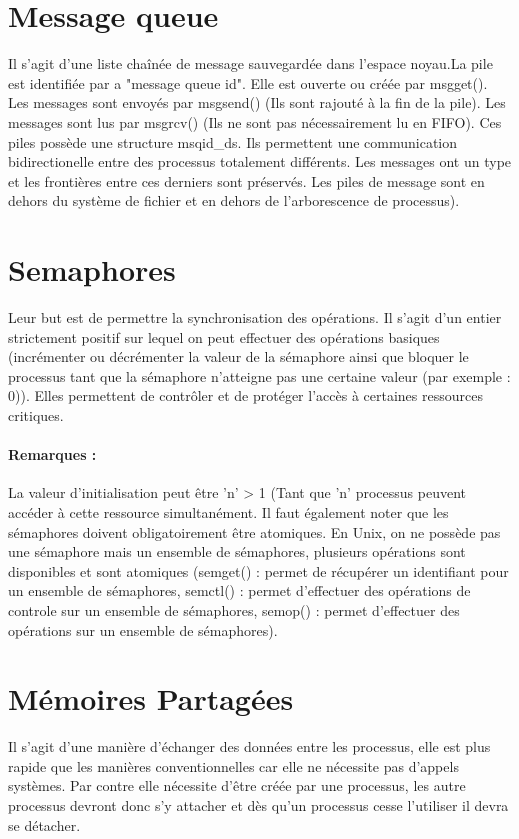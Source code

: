 \documentclass{article}[12pt]
\begin{document}
\section{Message queue}
Il s'agit d'une liste chaînée de message sauvegardée dans l'espace noyau.La pile est identifiée par a "message queue id". Elle est ouverte ou créée par msgget(). Les messages sont envoyés par msgsend() (Ils sont rajouté à la fin de la pile). Les messages sont lus par msgrcv() (Ils ne sont pas nécessairement lu en FIFO).  Ces piles possède une structure  msqid\_ds. Ils permettent une communication bidirectionelle entre des processus totalement différents. Les messages ont un type et les frontières entre ces derniers sont préservés. Les piles de message sont en dehors du système de fichier et en dehors de l'arborescence de processus).
\section{Semaphores}
Leur but est de permettre la synchronisation des opérations. Il s'agit d'un entier strictement positif sur lequel on peut effectuer des opérations basiques (incrémenter ou décrémenter la valeur de la sémaphore ainsi que bloquer le processus tant que la sémaphore n'atteigne pas une certaine valeur (par exemple : 0)). Elles permettent de contrôler et de protéger l'accès à certaines ressources critiques.
\paragraph{Remarques : } La valeur d'initialisation peut être 'n' > 1 (Tant que 'n' processus peuvent accéder à cette ressource simultanément. Il faut également noter que les sémaphores doivent obligatoirement être atomiques. En Unix, on ne possède pas une sémaphore mais un ensemble de sémaphores, plusieurs opérations sont disponibles et sont atomiques (semget() : permet de récupérer un identifiant pour un ensemble de sémaphores, semctl() : permet d'effectuer des opérations de controle sur un ensemble de sémaphores, semop() : permet d'effectuer des opérations sur un ensemble de sémaphores).
\section{Mémoires Partagées}
Il s'agit d'une manière d'échanger des données entre les processus, elle est plus rapide que les manières conventionnelles car elle ne nécessite pas d'appels systèmes. Par contre elle nécessite d'être créée par une processus, les autre processus devront donc s'y attacher et dès qu'un processus cesse l'utiliser il devra se détacher.
\end{document}
